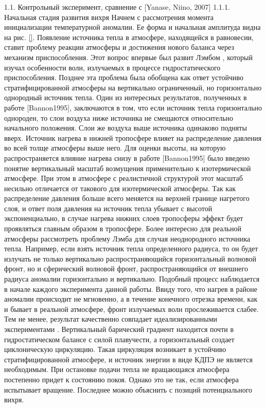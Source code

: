 1.1.	Контрольный эксперимент, сравнение с [Yanase, Niino, 2007]
1.1.1.	Начальная стадия развития вихря
Начнем с рассмотрения момента инициализации температурной аномалии. Ее форма и начальная амплитуда видна на рис. \ref{}. 
Появление источника тепла в атмосфере, находящейся в равновесии, ставит проблему реакции атмосферы и достижения нового баланса через механизм приспособления. Этот вопрос впервые был развит Лэмбом \cite{RT2003}, который изучал особенности волн, излучаемых в процессе гидростатического приспособления. Позднее эта проблема была обобщена как ответ устойчиво стратифицированной атмосферы на вертикально ограниченный, но горизонтально однородный источник тепла. Один из интересных результатов, полученных в работе [Bannon1995], заключаются в том, что если источник тепла горизонтально однороден, то слои воздуха ниже источника не смещаются относительно начального положения. Слои же воздуха выше источника одинаково подняты вверх. Источник нагрева в нижней тропосфере влияет на распределение давления во всей толще атмосферы выше него. Для оценки высоты, на которую распространяется влияние нагрева снизу в работе [Bannon1995] было введено понятие вертикальный масштаб возмущения применительно к изотермической атмосфере. При этом в атмосфере с реалистичной структурой этот масштаб несильно отличается от такового для изотермической атмосферы. Так как распределение давления больше всего меняется на верхней границе нагретого слоя, и ответ поля давления на источник тепла убывает с высотой экспоненциально, в случае нагрева нижних слоев тропосферы эффект будет проявляться главным образом в тропосфере.
Более интересно для реальной атмосферы рассмотреть проблему Лэмба для случая неоднородного источника тепла. Например, если взять источник тепла определенного радиуса, то он будет излучать не только вертикально распространяющийся горизонтальный волновой фронт, но и сферический волновой фронт, распространяющийся от внешнего радиуса аномалии горизонтально и вертикально. 
Подобный процесс наблюдается в начале каждого эксперимента данной работы. Ввиду того, что нагрев в районе аномалии происходит не мгновенно, а в течение конечного отрезка времени, как и бывает в реальной атмосфере,  фронт излучаемых волн прослеживается слабее. Тем не менее, результат качественно совпадает идеализированными экспериментами \cite{RT2003}. Вертикальный барический градиент находится почти в гидростатическом балансе с силой плавучести, а горизонтальный создает циклоническую циркуляцию. Такая циркуляция возникает в устойчиво стратифицированной атмосфере, и источник энергии в виде КДПЭ не является необходимым. При остановке подачи тепла не вращающаяся атмосфера постепенно придет к состоянию покоя. Однако это не так, если атмосфера испытывает вращение. Последнее можно объяснить с позиций потенциального вихря.
